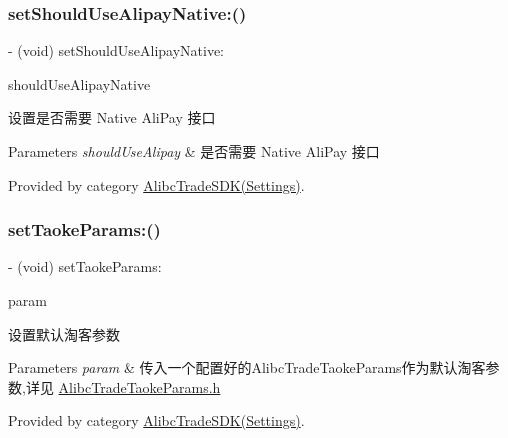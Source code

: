 \subsubsection{\texorpdfstring{set\+Should\+Use\+Alipay\+Native\+:()}{setShouldUseAlipayNative:()}}
{\footnotesize\ttfamily -\/ (void) set\+Should\+Use\+Alipay\+Native\+: \begin{DoxyParamCaption}\item[{(B\+O\+OL)}]{should\+Use\+Alipay\+Native }\end{DoxyParamCaption}}

设置是否需要 Native Ali\+Pay 接口


\begin{DoxyParams}{Parameters}
{\em should\+Use\+Alipay} & 是否需要 Native Ali\+Pay 接口 \\
\hline
\end{DoxyParams}


Provided by category \mbox{\hyperlink{category_alibc_trade_s_d_k_07_settings_08_aacfcf26210f84b53ce09dd44e68dd91a}{Alibc\+Trade\+S\+D\+K(\+Settings)}}.

\mbox{\label{interface_alibc_trade_s_d_k_aa6e5c46a89ab3539e6d95b827d31bae5}} 
\subsubsection{\texorpdfstring{set\+Taoke\+Params\+:()}{setTaokeParams:()}}
{\footnotesize\ttfamily -\/ (void) set\+Taoke\+Params\+: \begin{DoxyParamCaption}\item[{(\mbox{\hyperlink{interface_alibc_trade_taoke_params}{Alibc\+Trade\+Taoke\+Params}} $\ast$)}]{param }\end{DoxyParamCaption}}

设置默认淘客参数


\begin{DoxyParams}{Parameters}
{\em param} & 传入一个配置好的\+Alibc\+Trade\+Taoke\+Params作为默认淘客参数,详见 \mbox{\hyperlink{_alibc_trade_taoke_params_8h_source}{Alibc\+Trade\+Taoke\+Params.\+h}} \\
\hline
\end{DoxyParams}


Provided by category \mbox{\hyperlink{category_alibc_trade_s_d_k_07_settings_08_aa6e5c46a89ab3539e6d95b827d31bae5}{Alibc\+Trade\+S\+D\+K(\+Settings)}}.

